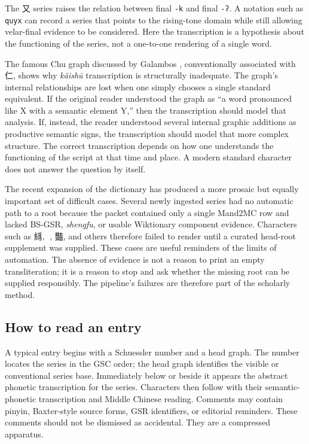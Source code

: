The 又 series raises the relation between final \texttt{-k} and final \texttt{-ʔ}. A notation such as \texttt{quyx} can record a series that points to the rising-tone domain while still allowing velar-final evidence to be considered. Here the transcription is a hypothesis about the functioning of the series, not a one-to-one rendering of a single word.

The famous Chu graph discussed by Galambos \parencite{galambos-2006}, conventionally associated with 仁, shows why \emph{kǎishū} transcription is structurally inadequate. The graph's internal relationships are lost when one simply chooses a single standard equivalent. If the original reader understood the graph as ``a word pronounced like X with a semantic element Y,'' then the transcription should model that analysis. If, instead, the reader understood several internal graphic additions as productive semantic signs, the transcription should model that more complex structure. The correct transcription depends on how one understands the functioning of the script at that time and place. A modern standard character does not answer the question by itself.

The recent expansion of the dictionary has produced a more prosaic but equally important set of difficult cases. Several newly ingested series had no automatic path to a root because the packet contained only a single Mand2MC row and lacked BS-GSR, \emph{shengfu}, or usable Wiktionary component evidence. Characters such as 絼, 𢀷, 豓, and others therefore failed to render until a curated head-root supplement was supplied. These cases are useful reminders of the limits of automation. The absence of evidence is not a reason to print an empty transliteration; it is a reason to stop and ask whether the missing root can be supplied responsibly. The pipeline's failures are therefore part of the scholarly method.

\subsection*{How to read an entry}

A typical entry begins with a Schuessler number and a head graph. The number locates the series in the GSC order; the head graph identifies the visible or conventional series base. Immediately below or beside it appears the abstract phonetic transcription for the series. Characters then follow with their semantic-phonetic transcription and Middle Chinese reading. Comments may contain pinyin, Baxter-style source forms, GSR identifiers, or editorial reminders. These comments should not be dismissed as accidental. They are a compressed apparatus.

